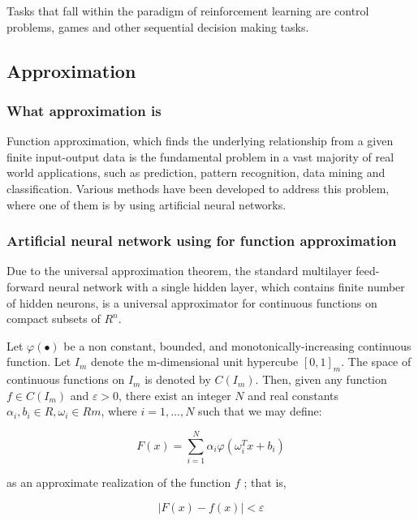 \documentclass[a4paper,12pt]{article}
\begin{document}
Tasks that fall within the paradigm of reinforcement learning are control problems, games and other sequential decision making tasks.

\subsection{Approximation}
\subsubsection{What approximation is}

Function approximation, which finds the underlying relationship from a given finite input-output data is the fundamental problem in a vast majority of real world applications, such as prediction, pattern recognition, data mining and classification. Various methods have been developed to address this problem, where one of them is by using artificial neural networks.

\subsubsection{Artificial neural network using for function approximation}

Due to the universal approximation theorem, the standard multilayer feed-forward neural network with a single hidden layer, which contains finite number of hidden neurons, is a universal approximator for continuous functions on compact subsets of $R^n$.

Let $\varphi(\bullet) $ be a non constant, bounded, and monotonically-increasing continuous function. Let $I_m$ denote the m-dimensional unit hypercube $ [0,1]_m. $ The space of continuous functions on $ I_m $ is denoted by $C(I_m)$. Then, given any function $ f \in C(I_m) $ and $ \varepsilon > 0 $, there exist an integer $ N $ and real constants $ \alpha_i, b_i \in R, \omega_i \in Rm $, where $ i = 1, \hdots, N $ such that we may define:

\begin{equation}
 F(x) = \sum\limits_{i=1}^N\alpha_i\varphi(\omega_i^Tx+b_i) 
\end{equation}

as an approximate realization of the function $ f $ ; that is,

\begin{equation}
 |F(x)-f(x)|<\varepsilon
\end{equation}
\end{document}
